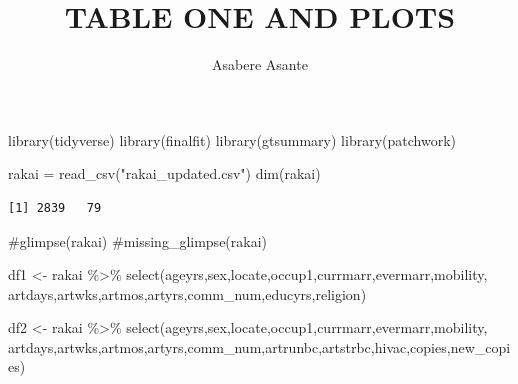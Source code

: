 \documentclass[
  letterpaper,
  DIV=11,
  numbers=noendperiod]{scrartcl}
\title{TABLE ONE AND PLOTS}
\author{Asabere Asante}
\date{}
\newenvironment{Shaded}{\begin{snugshade}}{\end{snugshade}}
\newcommand{\CommentTok}[1]{\textcolor[rgb]{0.37,0.37,0.37}{#1}}
\newcommand{\FunctionTok}[1]{\textcolor[rgb]{0.28,0.35,0.67}{#1}}
\newcommand{\NormalTok}[1]{\textcolor[rgb]{0.00,0.23,0.31}{#1}}
\newcommand{\OtherTok}[1]{\textcolor[rgb]{0.00,0.23,0.31}{#1}}
\newcommand{\SpecialCharTok}[1]{\textcolor[rgb]{0.37,0.37,0.37}{#1}}
\newcommand{\StringTok}[1]{\textcolor[rgb]{0.13,0.47,0.30}{#1}}
\begin{document}
\maketitle


\begin{Shaded}
\begin{Highlighting}[]
\FunctionTok{library}\NormalTok{(tidyverse)}
\FunctionTok{library}\NormalTok{(finalfit)}
\FunctionTok{library}\NormalTok{(gtsummary)}
\FunctionTok{library}\NormalTok{(patchwork)}
\end{Highlighting}
\end{Shaded}

\begin{Shaded}
\begin{Highlighting}[]
\NormalTok{rakai }\OtherTok{=} \FunctionTok{read\_csv}\NormalTok{(}\StringTok{"rakai\_updated.csv"}\NormalTok{)}
\FunctionTok{dim}\NormalTok{(rakai)}
\end{Highlighting}
\end{Shaded}

\begin{verbatim}
[1] 2839   79
\end{verbatim}

\begin{Shaded}
\begin{Highlighting}[]
\CommentTok{\#glimpse(rakai)}
\CommentTok{\#missing\_glimpse(rakai)}
\end{Highlighting}
\end{Shaded}

\begin{Shaded}
\begin{Highlighting}[]
\NormalTok{df1 }\OtherTok{\textless{}{-}}\NormalTok{ rakai }\SpecialCharTok{\%\textgreater{}\%} 
  \FunctionTok{select}\NormalTok{(ageyrs,sex,locate,occup1,currmarr,evermarr,mobility,}
\NormalTok{          artdays,artwks,artmos,artyrs,comm\_num,educyrs,religion)}
\end{Highlighting}
\end{Shaded}

\begin{Shaded}
\begin{Highlighting}[]
\NormalTok{df2 }\OtherTok{\textless{}{-}}\NormalTok{ rakai }\SpecialCharTok{\%\textgreater{}\%} 
  \FunctionTok{select}\NormalTok{(ageyrs,sex,locate,occup1,currmarr,evermarr,mobility,}
\NormalTok{  artdays,artwks,artmos,artyrs,comm\_num,artrunbc,artstrbc,hivac,copies,new\_copies)}
\end{Highlighting}
\end{Shaded}
\end{document}
